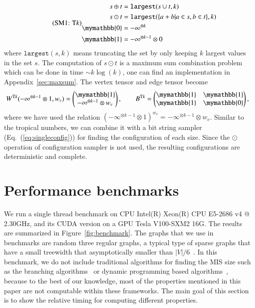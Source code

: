 \documentclass[onefignum, onetabnum]{siamart190516}
\newcommand{\eqname}[1]{\stepcounter{equation}\tag{\theequation : #1}}
\newcommand{\<}{\langle}
\renewcommand{\>}{\rangle}
\newcommand{\Eq}[1]{Eq.~(\ref{#1})}
\newcommand{\App}[1]{Appendix~\ref{#1}}
\begin{document}
\begin{equation}
\eqname{T$k$}
\begin{split}
    s \oplus t &= \texttt{largest}(s \cup t, k)\\
    s \odot t &= \texttt{largest}(\{a+b| a \in s, b\in t\}, k)\\
    \mymathbb{0} &= -\infty^{\otimes k}\\
    \mymathbb{1} &= -\infty^{\otimes k-1} \otimes 0
\end{split}\label{eq:ext-tropical}
\end{equation}
where $\texttt{largest}(s, k)$ means truncating the set by only keeping $k$ largest values in the set $s$.
The computation of $s \odot t$ is a maximum sum combination problem which can be done in time $\sim k\log(k)$,
one can find an implementation in \App{sec:maxsum}.
The vertex tensor and edge tensor become
\begin{equation}
    W^{{\rm T}k}(-\infty^{\otimes k-1} \otimes 1, w_v) = \left(\begin{matrix}
        \mymathbb{1} \\
        -\infty^{\otimes k-1} \otimes w_v
    \end{matrix}\right),   
    \qquad
        B^{{\rm T}k} = \left(\begin{matrix}
        \mymathbb{1}  & \mymathbb{1} \\
        \mymathbb{1} & \mymathbb{0}
    \end{matrix}\right),
\end{equation}
where we have used the relation $(-\infty^{\otimes k-1} \otimes 1)^{w_v} = -\infty^{\otimes k-1} \otimes w_v$.
Similar to the tropical numbers, we can combine it with a bit string sampler (\Eq{eq:singleconfig}) for finding the configuration of each size.
Since the $\odot$ operation of configuration sampler is not used, the resulting configurations are deterministic and complete.

\section{Performance benchmarks}\label{sec:benchmark}
We run a single thread benchmark on CPU Intel(R) Xeon(R) CPU E5-2686 v4 @ 2.30GHz,
and its CUDA version on a GPU Tesla V100-SXM2 16G.
The results are summarized in Figure~\ref{fig:benchmark}.
The graphs that we use in benchmarks are random three regular graphs,
 a typical type of sparse graphs that have a small treewidth that asymptotically smaller than $|V|/6$~\cite{Fomin2006}.
In this benchmark, we do not include traditional algorithms for finding the MIS size such as the branching algorithms~\cite{Tarjan1977, Robson1986} or dynamic programming based algorithms~\cite{Courcelle1990, Fomin2013},
because to the best of our knowledge, most of the properties mentioned in this paper are not computable within these frameworks.
The main goal of this section is to show the relative timing for computing different properties.
\end{document}
